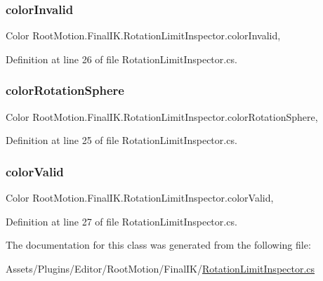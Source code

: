\subsubsection{\texorpdfstring{color\+Invalid}{colorInvalid}}
{\footnotesize\ttfamily Color Root\+Motion.\+Final\+I\+K.\+Rotation\+Limit\+Inspector.\+color\+Invalid\hspace{0.3cm}{\ttfamily [static]}, {\ttfamily [get]}}



Definition at line 26 of file Rotation\+Limit\+Inspector.\+cs.

\mbox{\label{class_root_motion_1_1_final_i_k_1_1_rotation_limit_inspector_ad67bda9082c9b3df76e8894823f266d9}} 
\subsubsection{\texorpdfstring{color\+Rotation\+Sphere}{colorRotationSphere}}
{\footnotesize\ttfamily Color Root\+Motion.\+Final\+I\+K.\+Rotation\+Limit\+Inspector.\+color\+Rotation\+Sphere\hspace{0.3cm}{\ttfamily [static]}, {\ttfamily [get]}}



Definition at line 25 of file Rotation\+Limit\+Inspector.\+cs.

\mbox{\label{class_root_motion_1_1_final_i_k_1_1_rotation_limit_inspector_a4b9e0dfbc418a8ada3306f5757050ff2}} 
\subsubsection{\texorpdfstring{color\+Valid}{colorValid}}
{\footnotesize\ttfamily Color Root\+Motion.\+Final\+I\+K.\+Rotation\+Limit\+Inspector.\+color\+Valid\hspace{0.3cm}{\ttfamily [static]}, {\ttfamily [get]}}



Definition at line 27 of file Rotation\+Limit\+Inspector.\+cs.



The documentation for this class was generated from the following file\+:\begin{DoxyCompactItemize}
\item 
Assets/\+Plugins/\+Editor/\+Root\+Motion/\+Final\+I\+K/\mbox{\hyperlink{_rotation_limit_inspector_8cs}{Rotation\+Limit\+Inspector.\+cs}}\end{DoxyCompactItemize}
